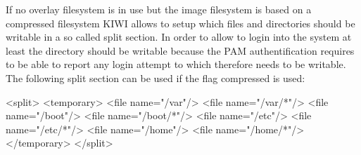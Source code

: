 If no overlay filesystem is in use but the image filesystem is based on
a compressed filesystem KIWI allows to setup which files and directories
should be writable in a so called split section. In order to allow to
login into the system at least the  directory should be writable
because the PAM authentification requires to be able to report any login
attempt to  which therefore needs to be writable. The
following split section can be used if the flag compressed
is used:  

\begin{xml}
<split>
   <temporary>
       <file name="/var"/>
       <file name="/var/*"/>
       <file name="/boot"/>
       <file name="/boot/*"/>
       <file name="/etc"/>
       <file name="/etc/*"/>
       <file name="/home"/>
       <file name="/home/*"/>
   </temporary>
</split>
\end{xml}
